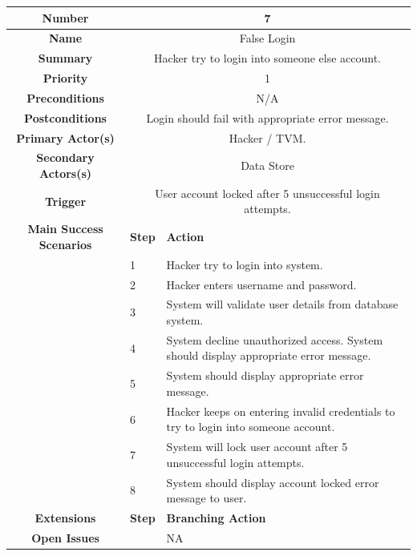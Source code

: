 \documentclass[a4paper,12pt]{report}
\begin{document}
\begin{tabular}{ | c | p{2cm} | p{7cm} |}
	
	\hline
	\textbf{Number} & \multicolumn{2}{c|}{7}  \\
	\hline
	\textbf{Name} & \multicolumn{2}{c|}{False Login}  \\
	\hline
	\textbf{Summary} & \multicolumn{2}{c|}{Hacker try to login into someone else account.}  \\
	\hline
	\textbf{Priority} & \multicolumn{2}{c|}{1}  \\
	\hline
	\textbf{Preconditions} & \multicolumn{2}{c|}{N/A}  \\
	\hline
	\textbf{Postconditions} & \multicolumn{2}{c|}{Login should fail with appropriate error message.}  \\
	\hline
	\textbf{Primary Actor(s)} & \multicolumn{2}{c|}{Hacker / TVM.}  \\
	\hline
	\textbf{Secondary Actors(s)} & \multicolumn{2}{c|}{Data Store}  \\
	\hline
	\textbf{Trigger} & \multicolumn{2}{c|}{User account locked after 5 unsuccessful login attempts.} \\
	\hline
	\textbf{Main Success Scenarios} & \textbf{Step} & \textbf{Action} \\
	\hline
	& 1 & Hacker try to login into system. \\ 
	\hline
	&  2  & Hacker enters username and password. \\
	\hline
	&  3  & System will validate user details from database system. \\
	\hline
	&  4  & System decline unauthorized access. System should display appropriate error message. \\
	\hline
	&  5  & System should display appropriate error message. \\
	\hline
	&  6  & Hacker keeps on entering invalid credentials to try to login into someone account. \\
	\hline
	&  7  & System will lock user account after 5 unsuccessful login attempts. \\
	\hline
	& 8 & System should display account locked error message to user. \\
	\hline
	
	\textbf{Extensions} & \textbf{Step} & \textbf{Branching Action} \\
	\hline
	\textbf{Open Issues} &    & NA \\
	\hline
	
\end{tabular}
\end{document}

